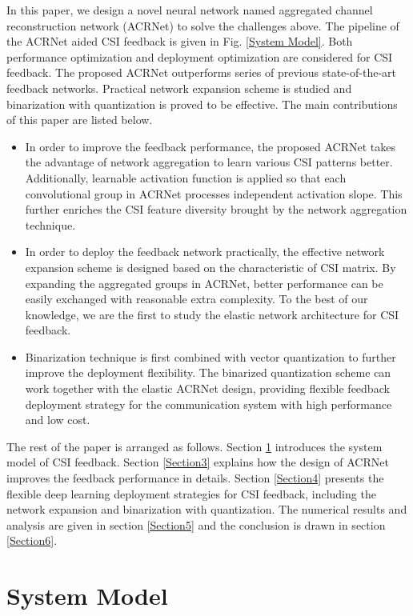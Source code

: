 \documentclass[12pt, draftclsnofoot, onecolumn]{IEEEtran}
\begin{document}
In this paper, we design a novel neural network named aggregated channel reconstruction network (ACRNet) to solve the challenges above. The pipeline of the ACRNet aided CSI feedback is given in Fig. \ref{System Model}. Both performance optimization and deployment optimization are considered for CSI feedback. The proposed ACRNet outperforms series of previous state-of-the-art feedback networks. Practical network expansion scheme is studied and binarization with quantization is proved to be effective. The main contributions of this paper are listed below.
\begin{itemize}
  \item In order to improve the feedback performance, the proposed ACRNet takes the advantage of network aggregation to learn various CSI patterns better. Additionally, learnable activation function is applied so that each convolutional group in ACRNet processes independent activation slope. This further enriches the CSI feature diversity brought by the network aggregation technique.
  \item In order to deploy the feedback network practically, the effective network expansion scheme is designed based on the characteristic of CSI matrix. By expanding the aggregated groups in ACRNet, better performance can be easily exchanged with reasonable extra complexity. To the best of our knowledge, we are the first to study the elastic network architecture for CSI feedback.
  \item Binarization technique is first combined with vector quantization to further improve the deployment flexibility. The binarized quantization scheme can work together with the elastic ACRNet design, providing flexible feedback deployment strategy for the communication system with high performance and low cost.
\end{itemize}

The rest of the paper is arranged as follows. Section \ref{Section2} introduces the system model of CSI feedback. Section \ref{Section3} explains how the design of ACRNet improves the feedback performance in details. Section \ref{Section4} presents the flexible deep learning deployment strategies for CSI feedback, including the network expansion and binarization with quantization. The numerical results and analysis are given in section \ref{Section5} and the conclusion is drawn in section \ref{Section6}.

\section{System Model} \label{Section2}
\end{document}
